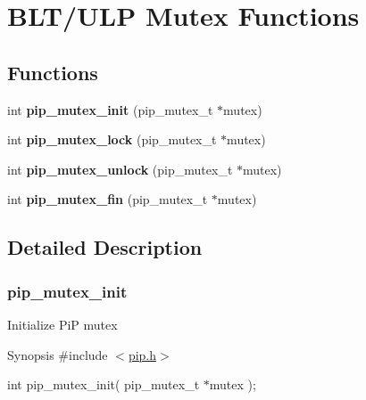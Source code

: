 \hypertarget{group__ulp-5-mutex}{\section{B\-L\-T/\-U\-L\-P Mutex Functions}
\label{group__ulp-5-mutex}
}
\subsection*{Functions}
\begin{DoxyCompactItemize}
\item 
\hypertarget{group__ulp-5-mutex_gaff168395426838d385ad6720c9fb4184}{int {\bfseries pip\-\_\-mutex\-\_\-init} (pip\-\_\-mutex\-\_\-t $\ast$mutex)}\label{group__ulp-5-mutex_gaff168395426838d385ad6720c9fb4184}

\item 
\hypertarget{group__ulp-5-mutex_ga14f77d2413590f58d7a45a3b56960c90}{int {\bfseries pip\-\_\-mutex\-\_\-lock} (pip\-\_\-mutex\-\_\-t $\ast$mutex)}\label{group__ulp-5-mutex_ga14f77d2413590f58d7a45a3b56960c90}

\item 
\hypertarget{group__ulp-5-mutex_ga370bb79d84360fdb96169fc5cea789ee}{int {\bfseries pip\-\_\-mutex\-\_\-unlock} (pip\-\_\-mutex\-\_\-t $\ast$mutex)}\label{group__ulp-5-mutex_ga370bb79d84360fdb96169fc5cea789ee}

\item 
\hypertarget{group__ulp-5-mutex_ga884fae0413bd07dbdb5f3940129b7b20}{int {\bfseries pip\-\_\-mutex\-\_\-fin} (pip\-\_\-mutex\-\_\-t $\ast$mutex)}\label{group__ulp-5-mutex_ga884fae0413bd07dbdb5f3940129b7b20}

\end{DoxyCompactItemize}


\subsection{Detailed Description}
\hypertarget{pip_mutex_init}{}\subsubsection{pip\-\_\-mutex\-\_\-init}\label{pip_mutex_init}
Initialize Pi\-P mutex

\begin{DoxyParagraph}{Synopsis}
\#include $<$\hyperlink{pip_8h_source}{pip.\-h}$>$ \par
int pip\-\_\-mutex\-\_\-init( pip\-\_\-mutex\-\_\-t $\ast$mutex );
\end{DoxyParagraph}

